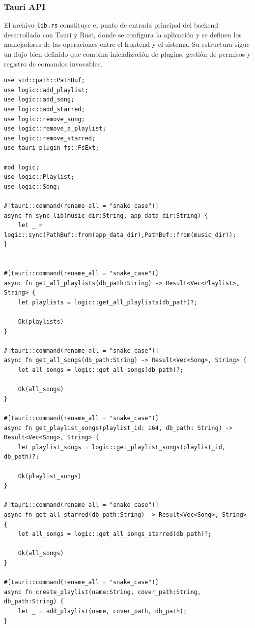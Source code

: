 \documentclass[11pt, a4paper]{article}
\begin{document}
            \subsubsection{Tauri API}

            El archivo \texttt{lib.rs} constituye el punto de entrada principal del backend desarrollado con Tauri y Rust, donde se configura la aplicación y se definen los manejadores de las operaciones entre el frontend y el sistema. Su estructura sigue un flujo bien definido que combina inicialización de plugins, gestión de permisos y registro de comandos invocables. \\

            \begin{lstlisting}[caption={lib.rs}]
use std::path::PathBuf;
use logic::add_playlist;
use logic::add_song;
use logic::add_starred;
use logic::remove_song;
use logic::remove_a_playlist;
use logic::remove_starred;
use tauri_plugin_fs::FsExt;

mod logic;
use logic::Playlist;
use logic::Song;

#[tauri::command(rename_all = "snake_case")]
async fn sync_lib(music_dir:String, app_data_dir:String) {
    let _ = logic::sync(PathBuf::from(app_data_dir),PathBuf::from(music_dir));
}


#[tauri::command(rename_all = "snake_case")]
async fn get_all_playlists(db_path:String) -> Result<Vec<Playlist>, String> {
    let playlists = logic::get_all_playlists(db_path)?;

    Ok(playlists)
}

#[tauri::command(rename_all = "snake_case")]
async fn get_all_songs(db_path:String) -> Result<Vec<Song>, String> {
    let all_songs = logic::get_all_songs(db_path)?;

    Ok(all_songs)
}

#[tauri::command(rename_all = "snake_case")]
async fn get_playlist_songs(playlist_id: i64, db_path: String) -> Result<Vec<Song>, String> {
    let playlist_songs = logic::get_playlist_songs(playlist_id, db_path)?;

    Ok(playlist_songs)
}

#[tauri::command(rename_all = "snake_case")]
async fn get_all_starred(db_path:String) -> Result<Vec<Song>, String> {
    let all_songs = logic::get_all_songs_starred(db_path)?;

    Ok(all_songs)
}

#[tauri::command(rename_all = "snake_case")]
async fn create_playlist(name:String, cover_path:String, db_path:String) {
    let _ = add_playlist(name, cover_path, db_path);
}


\end{lstlisting}
\end{document}
